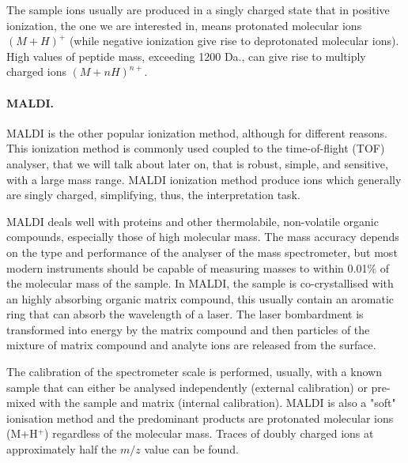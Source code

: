 The sample ions usually are produced in a singly charged state that in positive
ionization, the one we are interested in, means protonated molecular ions
$(M+H)^+$ (while negative ionization give rise to deprotonated molecular ions).
High values of peptide mass, exceeding 1200 Da., can give rise to multiply
charged ions $(M+nH)^{n+}$\cite{Takats2004}.



\paragraph{MALDI.}
MALDI is the other popular ionization method, although for different reasons.
This ionization method is commonly used coupled to the time-of-flight (TOF)
analyser, that we will talk about later on, that is robust, simple, and
sensitive, with a large mass range. 
MALDI ionization method produce ions which generally are singly charged,
simplifying, thus, the interpretation task.


MALDI \cite{hillenkamp1991maldi} deals well with proteins and other
thermolabile, non-volatile organic compounds, especially
those of high molecular mass.
The mass accuracy depends on the type and
performance of the analyser of the mass spectrometer, but most modern instruments should be capable of
measuring masses to within 0.01\% of the molecular mass of the sample.
In MALDI, the sample is co-crystallised with an highly absorbing organic matrix
compound, this usually contain an aromatic ring that can absorb the wavelength
of a laser. 
The laser bombardment is transformed into energy by the matrix compound and then
particles of the mixture of matrix compound and analyte ions are released from the surface.


The calibration of the spectrometer scale is performed, usually, with a known sample that can either be analysed
independently (external calibration) or pre-mixed with the sample and matrix (internal calibration).
MALDI is also a "soft" ionisation method and the predominant products are
protonated  molecular ions (M+H$^+$) regardless of the molecular mass.
Traces of doubly charged ions at approximately half the $m/z$ value can be found.


